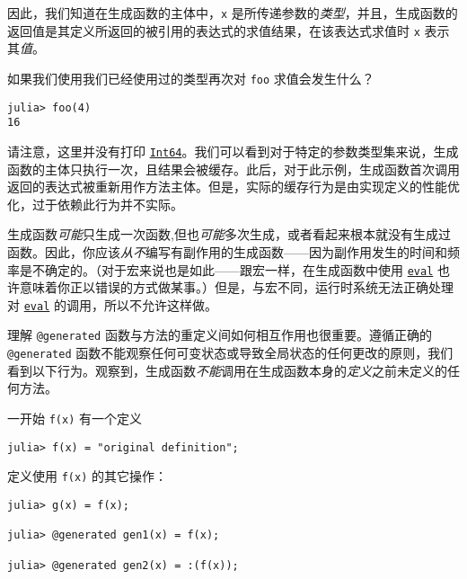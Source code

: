 因此，我们知道在生成函数的主体中，\texttt{x} 是所传递参数的\emph{类型}，并且，生成函数的返回值是其定义所返回的被引用的表达式的求值结果，在该表达式求值时 \texttt{x} 表示其\emph{值}。



如果我们使用我们已经使用过的类型再次对 \texttt{foo} 求值会发生什么？




\begin{verbatim}
julia> foo(4)
16
\end{verbatim}



请注意，这里并没有打印 \hyperlink{7720564657383125058}{\texttt{Int64}}。我们可以看到对于特定的参数类型集来说，生成函数的主体只执行一次，且结果会被缓存。此后，对于此示例，生成函数首次调用返回的表达式被重新用作方法主体。但是，实际的缓存行为是由实现定义的性能优化，过于依赖此行为并不实际。



生成函数\emph{可能}只生成一次函数,但也\emph{可能}多次生成，或者看起来根本就没有生成过函数。因此，你应该\emph{从不}编写有副作用的生成函数——因为副作用发生的时间和频率是不确定的。（对于宏来说也是如此——跟宏一样，在生成函数中使用 \hyperlink{7507639810592563424}{\texttt{eval}} 也许意味着你正以错误的方式做某事。）但是，与宏不同，运行时系统无法正确处理对 \hyperlink{7507639810592563424}{\texttt{eval}} 的调用，所以不允许这样做。



理解 \texttt{@generated} 函数与方法的重定义间如何相互作用也很重要。遵循正确的 \texttt{@generated} 函数不能观察任何可变状态或导致全局状态的任何更改的原则，我们看到以下行为。观察到，生成函数\emph{不能}调用在生成函数本身的\emph{定义}之前未定义的任何方法。



一开始 \texttt{f(x)} 有一个定义




\begin{verbatim}
julia> f(x) = "original definition";
\end{verbatim}



定义使用 \texttt{f(x)} 的其它操作：




\begin{verbatim}
julia> g(x) = f(x);

julia> @generated gen1(x) = f(x);

julia> @generated gen2(x) = :(f(x));
\end{verbatim}



